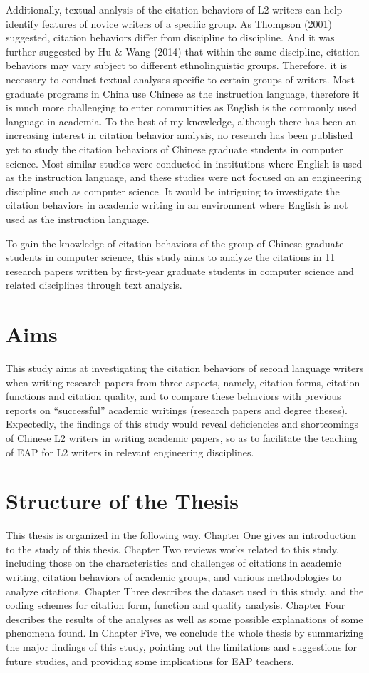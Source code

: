 Additionally, textual analysis of the citation behaviors of L2 writers can help identify features of novice writers of a specific group. As Thompson (2001) suggested, citation behaviors differ from discipline to discipline. And it was further suggested by Hu \& Wang (2014) that within the same discipline, citation behaviors may vary subject to different ethnolinguistic groups. Therefore, it is necessary to conduct textual analyses specific to certain groups of writers. Most graduate programs in China use Chinese as the instruction language, therefore it is much more challenging to enter communities as English is the commonly used language in academia. To the best of my knowledge, although there has been an increasing interest in citation behavior analysis, no research has been published yet to study the citation behaviors of Chinese graduate students in computer science. Most similar studies were conducted in institutions where English is used as the instruction language, and these studies were not focused on an engineering discipline such as computer science. It would be intriguing to investigate the citation behaviors in academic writing in an environment where English is not used as the instruction language.

To gain the knowledge of citation behaviors of the group of Chinese graduate students in computer science, this study aims to analyze the citations in 11 research papers written by first-year graduate students in computer science and related disciplines through text analysis.

\section{Aims}
This study aims at investigating the citation behaviors of second language writers when writing research papers from three aspects, namely, citation forms, citation functions and citation quality, and to compare these behaviors with previous reports on “successful” academic writings (research papers and degree theses). Expectedly, the findings of this study would reveal deficiencies and shortcomings of Chinese L2 writers in writing academic papers, so as to facilitate the teaching of EAP for L2 writers in relevant engineering disciplines.

\section{Structure of the Thesis}
This thesis is organized in the following way. Chapter One gives an introduction to the study of this thesis. Chapter Two reviews works related to this study, including those on the characteristics and challenges of citations in academic writing, citation behaviors of academic groups, and various methodologies to analyze citations. Chapter Three describes the dataset used in this study, and the coding schemes for citation form, function and quality analysis. Chapter Four describes the results of the analyses as well as some possible explanations of some phenomena found. In Chapter Five, we conclude the whole thesis by summarizing the major findings of this study, pointing out the limitations and suggestions for future studies, and providing some implications for EAP teachers.